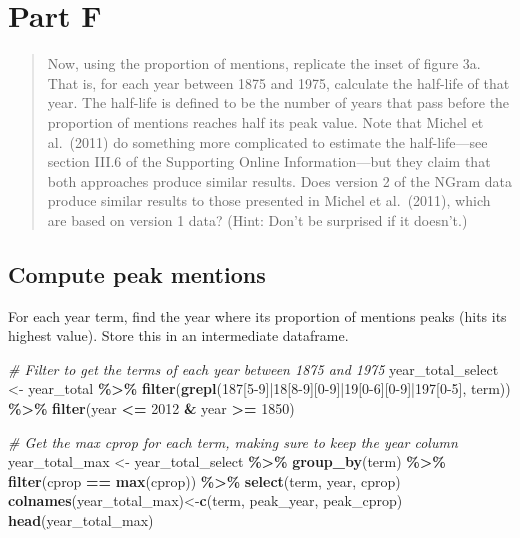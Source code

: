 \documentclass[
]{article}
\newenvironment{Shaded}{\begin{snugshade}}{\end{snugshade}}
\newcommand{\CommentTok}[1]{\textcolor[rgb]{0.56,0.35,0.01}{\textit{#1}}}
\newcommand{\DecValTok}[1]{\textcolor[rgb]{0.00,0.00,0.81}{#1}}
\newcommand{\FunctionTok}[1]{\textcolor[rgb]{0.13,0.29,0.53}{\textbf{#1}}}
\newcommand{\NormalTok}[1]{#1}
\newcommand{\OtherTok}[1]{\textcolor[rgb]{0.56,0.35,0.01}{#1}}
\newcommand{\SpecialCharTok}[1]{\textcolor[rgb]{0.81,0.36,0.00}{\textbf{#1}}}
\newcommand{\StringTok}[1]{\textcolor[rgb]{0.31,0.60,0.02}{#1}}
\begin{document}
\hypertarget{part-f}{%
\section{Part F}\label{part-f}}

\begin{quote}
Now, using the proportion of mentions, replicate the inset of figure 3a.
That is, for each year between 1875 and 1975, calculate the half-life of
that year. The half-life is defined to be the number of years that pass
before the proportion of mentions reaches half its peak value. Note that
Michel et al.~(2011) do something more complicated to estimate the
half-life---see section III.6 of the Supporting Online Information---but
they claim that both approaches produce similar results. Does version 2
of the NGram data produce similar results to those presented in Michel
et al.~(2011), which are based on version 1 data? (Hint: Don't be
surprised if it doesn't.)
\end{quote}

\hypertarget{compute-peak-mentions}{%
\subsection{Compute peak mentions}\label{compute-peak-mentions}}

For each year term, find the year where its proportion of mentions peaks
(hits its highest value). Store this in an intermediate dataframe.

\begin{Shaded}
\begin{Highlighting}[]
\CommentTok{\# Filter to get the terms of each year between 1875 and 1975}
\NormalTok{year\_total\_select }\OtherTok{\textless{}{-}}\NormalTok{ year\_total }\SpecialCharTok{\%\textgreater{}\%}
  \FunctionTok{filter}\NormalTok{(}\FunctionTok{grepl}\NormalTok{(}\StringTok{\textquotesingle{}187[5{-}9]|18[8{-}9][0{-}9]|19[0{-}6][0{-}9]|197[0{-}5]\textquotesingle{}}\NormalTok{, term)) }\SpecialCharTok{\%\textgreater{}\%} 
  \FunctionTok{filter}\NormalTok{(year }\SpecialCharTok{\textless{}=} \DecValTok{2012} \SpecialCharTok{\&}\NormalTok{ year }\SpecialCharTok{\textgreater{}=} \DecValTok{1850}\NormalTok{)}

\CommentTok{\# Get the max cprop for each term, making sure to keep the year column}
\NormalTok{year\_total\_max }\OtherTok{\textless{}{-}}\NormalTok{ year\_total\_select }\SpecialCharTok{\%\textgreater{}\%}
  \FunctionTok{group\_by}\NormalTok{(term) }\SpecialCharTok{\%\textgreater{}\%} 
  \FunctionTok{filter}\NormalTok{(cprop }\SpecialCharTok{==} \FunctionTok{max}\NormalTok{(cprop)) }\SpecialCharTok{\%\textgreater{}\%} 
  \FunctionTok{select}\NormalTok{(term, year, cprop)}
\FunctionTok{colnames}\NormalTok{(year\_total\_max)}\OtherTok{\textless{}{-}}\FunctionTok{c}\NormalTok{(}\StringTok{\textquotesingle{}term\textquotesingle{}}\NormalTok{, }\StringTok{\textquotesingle{}peak\_year\textquotesingle{}}\NormalTok{, }\StringTok{\textquotesingle{}peak\_cprop\textquotesingle{}}\NormalTok{)}
\FunctionTok{head}\NormalTok{(year\_total\_max)}
\end{Highlighting}
\end{Shaded}
\end{document}
